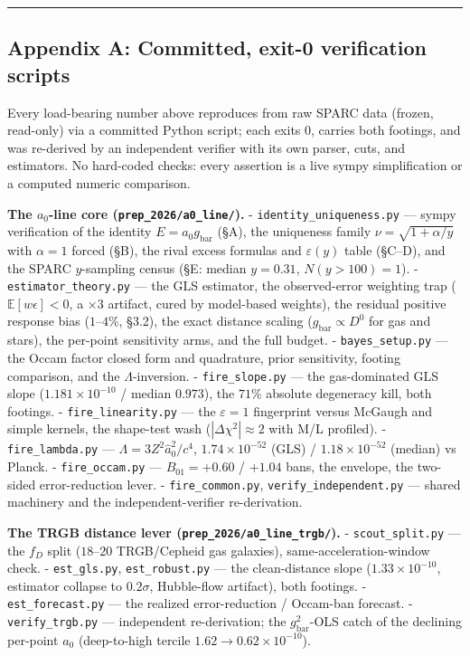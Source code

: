 \documentclass[
]{article}
\begin{document}
\begin{center}\rule{0.5\linewidth}{0.5pt}\end{center}

\subsection{Appendix A: Committed, exit-0 verification
scripts}\label{appendix-a-committed-exit-0-verification-scripts}

Every load-bearing number above reproduces from raw SPARC data (frozen,
read-only) via a committed Python script; each exits 0, carries both
footings, and was re-derived by an independent verifier with its own
parser, cuts, and estimators. No hard-coded checks: every assertion is a
live sympy simplification or a computed numeric comparison.

\textbf{The \(a_0\)-line core (\texttt{prep\_2026/a0\_line/}).} -
\texttt{identity\_uniqueness.py} --- sympy verification of the identity
\(E=a_0 g_\mathrm{bar}\) (§A), the uniqueness family
\(\nu=\sqrt{1+\alpha/y}\) with \(\alpha=1\) forced (§B), the rival
excess formulas and \(\varepsilon(y)\) table (§C--D), and the SPARC
\(y\)-sampling census (§E: median \(y=0.31\), \(N(y>100)=1\)). -
\texttt{estimator\_theory.py} --- the GLS estimator, the observed-error
weighting trap (\(\mathbb E[w\epsilon]<0\), a \(\times3\) artifact,
cured by model-based weights), the residual positive response bias
(\(1\)--\(4\%\), §3.2), the exact distance scaling
(\(g_\mathrm{bar}\propto D^0\) for gas and stars), the per-point
sensitivity arms, and the full budget. - \texttt{bayes\_setup.py} ---
the Occam factor closed form and quadrature, prior sensitivity, footing
comparison, and the \(\Lambda\)-inversion. - \texttt{fire\_slope.py} ---
the gas-dominated GLS slope (\(1.181\times10^{-10}\) / median
\(0.973\)), the \(71\%\) absolute degeneracy kill, both footings. -
\texttt{fire\_linearity.py} --- the \(\varepsilon=1\) fingerprint versus
McGaugh and simple kernels, the shape-test wash
(\(|\Delta\chi^2|\approx2\) with M/L profiled). -
\texttt{fire\_lambda.py} --- \(\Lambda=3Z^2\hat a_0^2/c^4\),
\(1.74\times10^{-52}\) (GLS) / \(1.18\times10^{-52}\) (median) vs
Planck. - \texttt{fire\_occam.py} --- \(B_{01}=+0.60\) / \(+1.04\) bans,
the envelope, the two-sided error-reduction lever. -
\texttt{fire\_common.py}, \texttt{verify\_independent.py} --- shared
machinery and the independent-verifier re-derivation.

\textbf{The TRGB distance lever (\texttt{prep\_2026/a0\_line\_trgb/}).}
- \texttt{scout\_split.py} --- the \(f_D\) split (\(18\)--\(20\)
TRGB/Cepheid gas galaxies), same-acceleration-window check. -
\texttt{est\_gls.py}, \texttt{est\_robust.py} --- the clean-distance
slope (\(1.33\times10^{-10}\), estimator collapse to \(0.2\sigma\),
Hubble-flow artifact), both footings. - \texttt{est\_forecast.py} ---
the realized error-reduction / Occam-ban forecast. -
\texttt{verify\_trgb.py} --- independent re-derivation; the
\(g_\mathrm{bar}^2\)-OLS catch of the declining per-point \(a_0\)
(deep-to-high tercile \(1.62\to0.62\times10^{-10}\)).
\end{document}
